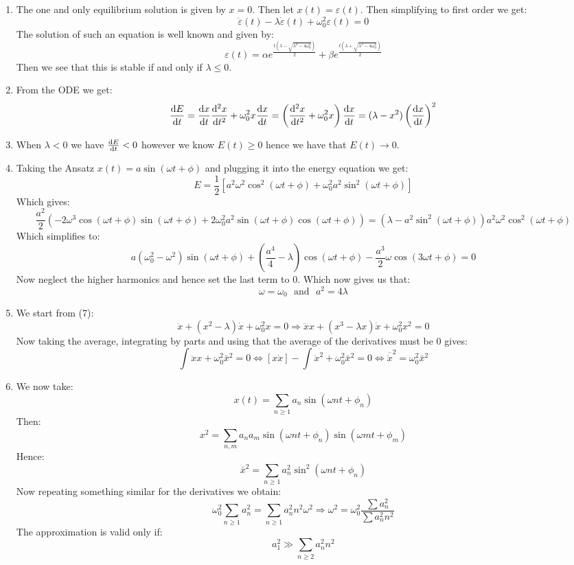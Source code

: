 \documentclass[10pt,a4paper]{book}
\begin{document}
\begin{enumerate}

\item The one and only equilibrium solution is given by $x = 0$. Then let $x(t) = \varepsilon(t)$. Then simplifying to first order we get:
\[
\ddot{\varepsilon}(t) - \lambda \dot{\varepsilon}(t) + \omega_0^2 \varepsilon(t) = 0 
\]
The solution of such an equation is well known and given by:
\[
\varepsilon(t) = \alpha e^{\frac{t(\lambda - \sqrt{\lambda^2 - 4 \omega_0^2})}{2}} + \beta e^{\frac{t(\lambda + \sqrt{\lambda^2 - 4 \omega_0^2})}{2}}
\]
Then we see that this is stable if and only if $\lambda \leq 0$. 

\item From the ODE we get:
\[
\dv{E}{t} = \dv{x}{t} \dv[2]{x}{t} + \omega_0^2 x \dv{x}{t} = \left( \dv[2]{x}{t} + \omega_0^2 x \right) \dv{x}{t} = (\lambda - x^2) \left(\dv{x}{t}\right)^2
\]

\item When $\lambda < 0$ we have $\dv{E}{t} < 0$ however we know $E(t) \geq 0$ hence we have that $E(t) \to 0$. 

\item Taking the Ansatz $x(t) = a \sin(\omega t + \phi)$ and plugging it into the energy equation we get:
\[
E = \frac{1}{2}\left[ a^2 \omega^2 \cos^2(\omega t + \phi) + \omega_0^2 a^2 \sin^2(\omega t + \phi) \right]
\]
Which gives:
\[
\frac{a^2}{2}( -2 \omega^3 \cos(\omega t + \phi) \sin(\omega t + \phi) + 2 \omega_0^2 a^2 \sin(\omega t + \phi) \cos(\omega t + \phi)   ) = (\lambda - a^2 \sin^2(\omega t + \phi)) a^2 \omega^2 \cos^2(\omega t + \phi)
\]
Which simplifies to:
\[
a(\omega_0^2 - \omega^2) \sin(\omega t + \phi) + (\frac{a^4}{4} - \lambda) \cos(\omega t + \phi) - \frac{a^3}{2} \omega \cos(3 \omega t + \phi) = 0
\]
Now neglect the higher harmonics and hence set the last term to 0. Which now gives us that:
\[
\omega = \omega_0 \mbox{~~and~~} a^2 = 4 \lambda
\]

\item We start from (7):
\[
\ddot{x} + (x^2 - \lambda)\dot{x} + \omega_0^2 x = 0 \Rightarrow \ddot{x} x + (x^3- \lambda x) \dot{x} + \omega_0^2 x^2  = 0 
\]
Now taking the average, integrating by parts and using that the average of the derivatives must be 0 gives:
\[
\int \ddot{x} x + \omega_0^2 \bar{x}^2 = 0 \Leftrightarrow [x \dot{x}] - \int \dot{x}^2 + \omega_0^2 \bar{x}^2 = 0 \Leftrightarrow \overline{\dot{x}}^2 = \omega_0^2 \bar{x}^2
\]

\item We now take:
\[
x(t) = \sum_{n \geq 1} a_n \sin(\omega n t + \phi_n)
\]
Then:
\[
x^2 = \sum_{n, m} a_n a_m \sin(\omega n t + \phi_n) \sin(\omega m t + \phi_m) 
\]
Hence:
\[
\bar{x}^2 = \sum_{n \geq 1} a_n^2 \sin^2(\omega n t + \phi_n)
\]
Now repeating something similar for the derivatives we obtain:
\[
\omega_0^2 \sum_{n \geq 1} a_n^2 = \sum_{n \geq 1} a_n^2 n^2 \omega^2 \Rightarrow \omega^2 = \omega_0^2 \frac{\sum a_n^2}{\sum a_n^2 n^2}
\]
The approximation is valid only if:
\[
a_1^2 \gg \sum_{n \geq 2} a_n^2 n^2
\]


\end{enumerate}
\end{document}
